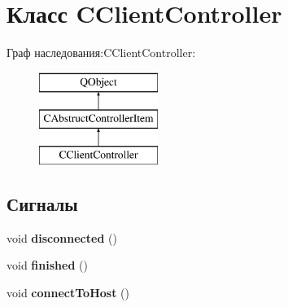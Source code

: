 \hypertarget{class_c_client_controller}{}\section{Класс C\+Client\+Controller}
\label{class_c_client_controller}
Граф наследования\+:C\+Client\+Controller\+:\begin{figure}[H]
\begin{center}
\leavevmode
\includegraphics[height=3.000000cm]{class_c_client_controller}
\end{center}
\end{figure}
\subsection*{Сигналы}
\begin{DoxyCompactItemize}
\item 
\hypertarget{class_c_client_controller_a171db18126ffb9541f47aec5cc0eda79}{}\label{class_c_client_controller_a171db18126ffb9541f47aec5cc0eda79} 
void {\bfseries disconnected} ()
\item 
\hypertarget{class_c_client_controller_a04a024fdb1135b1b5dec86b006511672}{}\label{class_c_client_controller_a04a024fdb1135b1b5dec86b006511672} 
void {\bfseries finished} ()
\item 
\hypertarget{class_c_client_controller_a358ef743560d560acef69e90dfaca11e}{}\label{class_c_client_controller_a358ef743560d560acef69e90dfaca11e} 
void {\bfseries connect\+To\+Host} ()
\end{DoxyCompactItemize}
